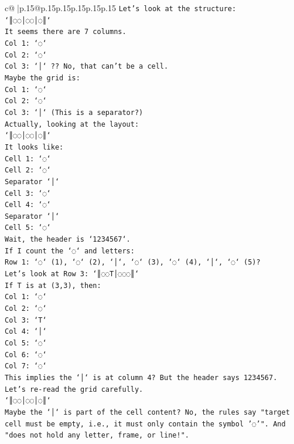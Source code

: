\documentclass{article}
\begin{document}
{\begin{supertabular}{c@{$\;$}|p{.15\linewidth}@{}p{.15\linewidth}p{.15\linewidth}p{.15\linewidth}p{.15\linewidth}p{.15\linewidth}}
{{{\texttt{Let's look at the structure:} \\
\texttt{`║◌◌│◌◌│◌║`} \\
\texttt{It seems there are 7 columns.} \\
\texttt{Col 1: `◌`} \\
\texttt{Col 2: `◌`} \\
\texttt{Col 3: `│` ?? No, that can't be a cell.} \\
\texttt{Maybe the grid is:} \\
\texttt{Col 1: `◌`} \\
\texttt{Col 2: `◌`} \\
\texttt{Col 3: `│` (This is a separator?)} \\
\texttt{Actually, looking at the layout:} \\
\texttt{`║◌◌│◌◌│◌║`} \\
\texttt{It looks like:} \\
\texttt{Cell 1: `◌`} \\
\texttt{Cell 2: `◌`} \\
\texttt{Separator `│`} \\
\texttt{Cell 3: `◌`} \\
\texttt{Cell 4: `◌`} \\
\texttt{Separator `│`} \\
\texttt{Cell 5: `◌`} \\
\texttt{Wait, the header is `1234567`.} \\
\texttt{If I count the `◌` and letters:} \\
\texttt{Row 1: `◌` (1), `◌` (2), `│`, `◌` (3), `◌` (4), `│`, `◌` (5)?} \\
\texttt{Let's look at Row 3: `║◌◌T│◌◌◌║`} \\
\texttt{If T is at (3,3), then:} \\
\texttt{Col 1: `◌`} \\
\texttt{Col 2: `◌`} \\
\texttt{Col 3: `T`} \\
\texttt{Col 4: `│`} \\
\texttt{Col 5: `◌`} \\
\texttt{Col 6: `◌`} \\
\texttt{Col 7: `◌`} \\
\texttt{This implies the `│` is at column 4? But the header says 1234567.} \\
\texttt{Let's re{-}read the grid carefully.} \\
\texttt{`║◌◌│◌◌│◌║`} \\
\texttt{Maybe the `│` is part of the cell content? No, the rules say "target cell must be empty, i.e., it must only contain the symbol '◌'". And "does not hold any letter, frame, or line!".} \\
}}}
\end{supertabular}}
\end{document}
